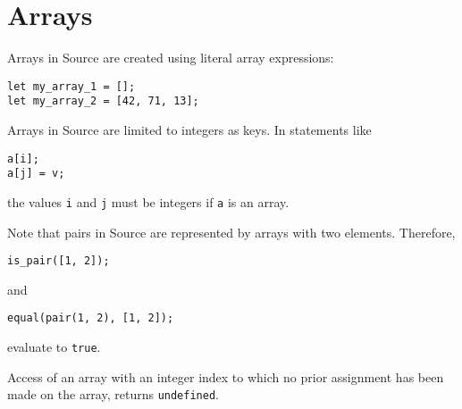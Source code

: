 \section*{Arrays}

Arrays in Source are created using literal array expressions:
\begin{lstlisting}
let my_array_1 = [];
let my_array_2 = [42, 71, 13];
\end{lstlisting}
Arrays in Source are limited to integers as keys.
In statements like
\begin{lstlisting}
a[i];
a[j] = v;
\end{lstlisting}
the values \lstinline{i} and \lstinline{j} must be integers if \lstinline{a} is an array.

Note that pairs in Source are represented by arrays with two elements. Therefore,
\begin{lstlisting}
is_pair([1, 2]);
\end{lstlisting}
and
\begin{lstlisting}
equal(pair(1, 2), [1, 2]);
\end{lstlisting}
evaluate to \texttt{true}.

Access of an array with an integer index to which no prior assignment has been
made on the array, returns \texttt{undefined}.
